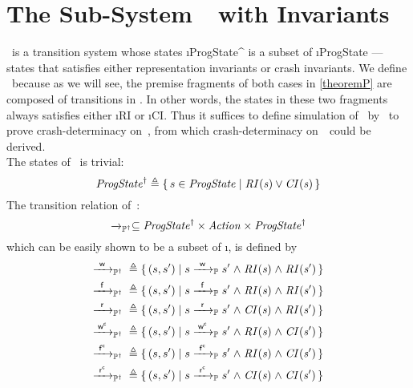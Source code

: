 \section{The Sub-System~\ProgInv\ with Invariants}
\label{sec:ProgInv}
\ProgInv\ is a transition system whose states \i{ProgState^\dagger} is a subset of \i{ProgState} \---- states that satisfies either representation invariants or crash invariants. We define \ProgInv\ because as we will see, the premise fragments of both cases in \cref{theoremP} are composed of transitions in \ProgInv. In other words, the states in these two fragments always satisfies either \i{RI} or \i{CI}. Thus it suffices to define simulation of \ProgInv\ by \Spec\ to prove crash-determinacy on~\ProgInv, from which crash-determinacy on~\Prog\ could be derived. \\
The states of \ProgInv\ is trivial:
$$\mathit{ProgState^{\dagger}} {}\triangleq{}{} \{\, s \in \mathit{ProgState} \mid \mathit{RI(s) \lor CI(s)} \,\}$$
The transition relation of~\ProgInv:
$$\xrightarrow{}_{\mathbb P^\dagger} \subseteq \mathit{ProgState^\dagger} \times \mathit{Action} \times \mathit{ProgState^\dagger}$$
which can be easily shown to be a subset of \i{\ttP{}}, is defined by
\begin{alignat*}{3}
	\ttPI{\awa{w}\actw} \defeq{}& \{\, (s, s') \mid s \ttP{\awa{w}\actw} s' \conj \i{RI(s)} \conj \i{RI(s')} \,\} \\
	\ttPI{\awa{w}\actf} \defeq{}& \{\, (s, s') \mid s \ttP{\awa{w}\actf} s' \conj \i{RI(s)} \conj \i{RI(s')} \,\} \\
	\ttPI{\awa{w}\actr} \defeq{}& \{\, (s, s') \mid s \ttP{\awa{w}\actr} s' \conj \i{CI(s)} \conj \i{RI(s')} \,\} \\
	\ttPI{\awa{w}\actwc} \defeq{}& \{\, (s, s') \mid s \ttP{\awa{w}\actwc} s' \conj \i{RI(s)} \conj \i{CI(s')} \,\} \\
	\ttPI{\awa{w}\actfc} \defeq{}& \{\, (s, s') \mid s \ttP{\awa{w}\actfc} s' \conj \i{RI(s)} \conj \i{CI(s')} \,\} \\
	\ttPI{\awa{w}\actrc} \defeq{}& \{\, (s, s') \mid s \ttP{\awa{w}\actrc} s' \conj \i{CI(s)} \conj \i{CI(s')} \,\} 
\end{alignat*}

